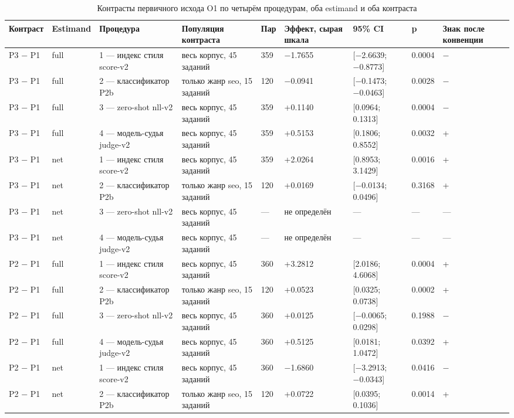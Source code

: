 \begin{table}[htbp]
\centering
\scriptsize
\caption{Контрасты первичного исхода O1 по четырём процедурам, оба estimand и оба контраста}
\label{tab:3}
\begin{tabular}{lllllllll}
\toprule
Контраст & Estimand & Процедура & Популяция контраста & Пар & Эффект, сырая шкала & 95\% CI & p & Знак после конвенции \\
\midrule
P3 − P1 & full & 1 — индекс стиля score-v2 & весь корпус, 45 заданий & 359 & −1.7655 & [−2.6639; −0.8773] & 0.0004 & − \\
P3 − P1 & full & 2 — классификатор P2b & только жанр seo, 15 заданий & 120 & −0.0941 & [−0.1473; −0.0463] & 0.0028 & − \\
P3 − P1 & full & 3 — zero-shot nll-v2 & весь корпус, 45 заданий & 359 & +0.1140 & [0.0964; 0.1313] & 0.0004 & − \\
P3 − P1 & full & 4 — модель-судья judge-v2 & весь корпус, 45 заданий & 359 & +0.5153 & [0.1806; 0.8552] & 0.0032 & + \\
P3 − P1 & net & 1 — индекс стиля score-v2 & весь корпус, 45 заданий & 359 & +2.0264 & [0.8953; 3.1429] & 0.0016 & + \\
P3 − P1 & net & 2 — классификатор P2b & только жанр seo, 15 заданий & 120 & +0.0169 & [−0.0134; 0.0496] & 0.3168 & + \\
P3 − P1 & net & 3 — zero-shot nll-v2 & весь корпус, 45 заданий & — & не определён & — & — & — \\
P3 − P1 & net & 4 — модель-судья judge-v2 & весь корпус, 45 заданий & — & не определён & — & — & — \\
P2 − P1 & full & 1 — индекс стиля score-v2 & весь корпус, 45 заданий & 360 & +3.2812 & [2.0186; 4.6068] & 0.0004 & + \\
P2 − P1 & full & 2 — классификатор P2b & только жанр seo, 15 заданий & 120 & +0.0523 & [0.0325; 0.0738] & 0.0002 & + \\
P2 − P1 & full & 3 — zero-shot nll-v2 & весь корпус, 45 заданий & 360 & +0.0125 & [−0.0065; 0.0298] & 0.1988 & − \\
P2 − P1 & full & 4 — модель-судья judge-v2 & весь корпус, 45 заданий & 360 & +0.5125 & [0.0181; 1.0472] & 0.0392 & + \\
P2 − P1 & net & 1 — индекс стиля score-v2 & весь корпус, 45 заданий & 360 & −1.6860 & [−3.2913; −0.0343] & 0.0416 & − \\
P2 − P1 & net & 2 — классификатор P2b & только жанр seo, 15 заданий & 120 & +0.0722 & [0.0395; 0.1036] & 0.0014 & + \\

\end{tabular}
\end{table}
